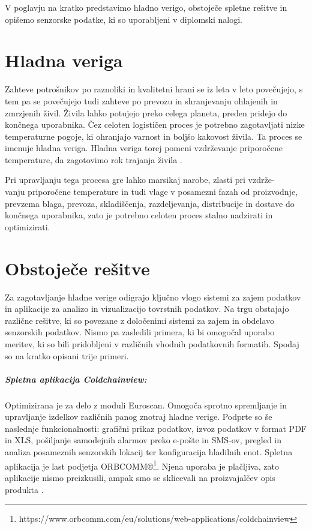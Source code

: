 \documentclass[a4paper, 12pt]{book}
\begin{document}
V poglavju na kratko predstavimo hladno verigo, obstoječe spletne rešitve in opišemo senzorske podatke, ki so uporabljeni v diplomski nalogi.

\section{Hladna veriga}

Zahteve potrošnikov po raznoliki in kvalitetni hrani se iz leta v leto povečujejo, s tem pa se povečujejo tudi zahteve po prevozu in shranjevanju ohlajenih in zmrzjenih živil. Živila lahko potujejo preko celega planeta, preden pridejo do končnega uporabnika. Čez celoten logističen proces je potrebno zagotavljati nizke temperaturne pogoje, ki ohranjajo varnost in boljšo kakovost živila. Ta proces se imenuje hladna veriga.
Hladna veriga torej pomeni vzdrževanje priporočene temperature, da zagotovimo rok trajanja živila \cite{hladna-veriga}.

Pri upravljanju tega procesa gre lahko marsikaj narobe, zlasti pri
vzdrže-\\vanju priporočene temperature in tudi vlage v posamezni fazah od proizvodnje, prevzema blaga, prevoza, skladiščenja, razdeljevanja, distribucije in dostave do končnega uporabnika, zato je potrebno celoten proces stalno nadzirati in optimizirati.


\section{Obstoječe rešitve}

Za zagotavljanje hladne verige odigrajo ključno vlogo sistemi za zajem podatkov in aplikacije za analizo in vizualizacijo tovrstnih podatkov. 
Na trgu obstajajo različne rešitve, ki so povezane z določenimi sistemi za zajem in obdelavo senzorskih podatkov. Nismo pa zasledili primera, ki bi omogočal uporabo meritev, ki so bili pridobljeni v različnih vhodnih podatkovnih formatih. 
Spodaj so na kratko opisani trije primeri.


\subparagraph{\textbf{Spletna aplikacija Coldchainview:}} 
Optimizirana je za delo z moduli Euroscan. Omogoča sprotno spremljanje in upravljanje izdelkov različnih panog znotraj hladne verige. Podprte so še naslednje funkcionalnosti: grafični prikaz podatkov, izvoz podatkov v format PDF in XLS, pošiljanje samodejnih alarmov preko e-pošte in SMS-ov, pregled in analiza posameznih senzorskih lokacij ter konfiguracija hladilnih enot.
Spletna aplikacija je last podjetja ORBCOMM®\footnote
{https://www.orbcomm.com/eu/solutions/web-applications/coldchainview}. Njena uporaba je plačljiva, zato aplikacije nismo preizkusili, ampak smo se sklicevali na proizvajalčev opis produkta \cite{coldchainview}.
\end{document}
